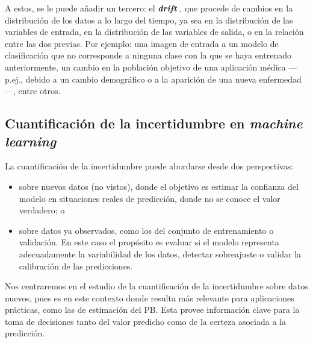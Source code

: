 A estos, se le puede añadir un tercero: el \textbf{\textit{drift}} \cite{gama2012}, que procede de cambios en 
la distribución de los datos a lo largo del tiempo, ya sea en la distribución de las variables de entrada, en 
la distribución de las variables de salida, o en la relación entre las dos previas. Por ejemplo: una imagen 
de entrada a un modelo de clasificación que no corresponde a ninguna clase con la que se haya entrenado 
anteriormente, un cambio en la población objetivo de una aplicación médica ---p.ej., debido a un cambio 
demográfico o a la aparición de una nueva enfermedad---, entre otros. 


\subsection{Cuantificación de la incertidumbre en \textit{machine learning}}

La cuantificación de la incertidumbre puede abordarse desde dos perspectivas: 

\begin{itemize}
    
    \item sobre nuevos datos (no vistos), donde el objetivo es estimar la confianza del modelo en situaciones 
    reales de predicción, donde no se conoce el valor verdadero; o

    \item sobre datos ya observados, como los del conjunto de entrenamiento o validación. En este caso el 
    propósito es evaluar si el modelo representa adecuadamente la variabilidad de los datos, detectar 
    sobreajuste o validar la calibración de las predicciones.

\end{itemize}

Nos centraremos en el estudio de la cuantificación de la incertidumbre sobre datos nuevos, pues es en este 
contexto donde resulta más relevante para aplicaciones prácticas, como las de estimación del PB. 
Esta provee información clave para la toma de decisiones tanto del valor predicho como de la certeza asociada
a la predicción. 

